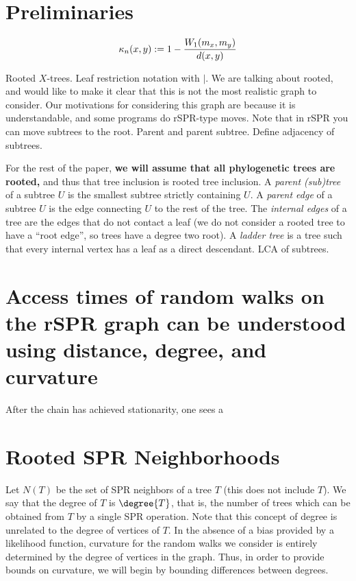 \documentclass{amsart}
\newcommand{\curvature}[2][]{%
    \ifthenelse{\equal{#1}{}}%
		{\kappa_n(#2)}%
		{\kappa_n(#1;#2)}%
}
\begin{document}
\section{Preliminaries}
\begin{equation}
\curvature{x, y} := 1 - \frac{W_1(m_x, m_y)}{d(x, y)}
\label{eq:curvatureDef}
\end{equation}

Rooted $X$-trees.
Leaf restriction notation with $|$.
We are talking about rooted, and would like to make it clear that this is not the most realistic graph to consider.
Our motivations for considering this graph are because it is understandable, and some programs do rSPR-type moves.
Note that in rSPR you can move subtrees to the root.
Parent and parent subtree.
Define adjacency of subtrees.

For the rest of the paper, \textbf{we will assume that all phylogenetic trees are rooted,} and thus that tree inclusion is rooted tree inclusion.
A \emph{parent (sub)tree} of a subtree $U$ is the smallest subtree strictly containing $U$.
A \emph{parent edge} of a subtree $U$ is the edge connecting $U$ to the rest of the tree.
The \emph{internal edges} of a tree are the edges that do not contact a leaf (we do not consider a rooted tree to have a ``root edge'', so trees have a degree two root).
A \emph{ladder tree} is a tree such that every internal vertex has a leaf as a direct descendant.
LCA of subtrees.

\section{Access times of random walks on the rSPR graph can be understood using distance, degree, and curvature}

After the chain has achieved stationarity, one sees a


\section{Rooted SPR Neighborhoods}

Let $N(T)$ be the set of SPR neighbors of a tree $T$ (this does not include $T$).
We say that the degree of $T$ is $\degree{T}$, that is, the number of trees which can be obtained from $T$ by a single SPR operation.
Note that this concept of degree is unrelated to the degree of vertices of $T$.
In the absence of a bias provided by a likelihood function, curvature for the random walks we consider is entirely determined by the degree of vertices in the graph.
Thus, in order to provide bounds on curvature, we will begin by bounding differences between degrees.
\end{document}
